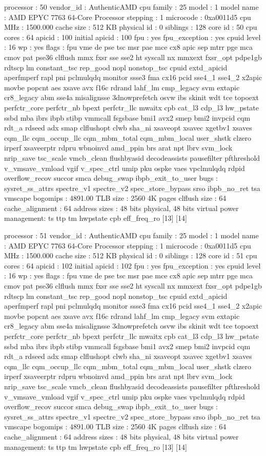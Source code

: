 processor	: 50
vendor_id	: AuthenticAMD
cpu family	: 25
model		: 1
model name	: AMD EPYC 7763 64-Core Processor
stepping	: 1
microcode	: 0xa0011d5
cpu MHz		: 1500.000
cache size	: 512 KB
physical id	: 0
siblings	: 128
core id		: 50
cpu cores	: 64
apicid		: 100
initial apicid	: 100
fpu		: yes
fpu_exception	: yes
cpuid level	: 16
wp		: yes
flags		: fpu vme de pse tsc msr pae mce cx8 apic sep mtrr pge mca cmov pat pse36 clflush mmx fxsr sse sse2 ht syscall nx mmxext fxsr_opt pdpe1gb rdtscp lm constant_tsc rep_good nopl nonstop_tsc cpuid extd_apicid aperfmperf rapl pni pclmulqdq monitor ssse3 fma cx16 pcid sse4_1 sse4_2 x2apic movbe popcnt aes xsave avx f16c rdrand lahf_lm cmp_legacy svm extapic cr8_legacy abm sse4a misalignsse 3dnowprefetch osvw ibs skinit wdt tce topoext perfctr_core perfctr_nb bpext perfctr_llc mwaitx cpb cat_l3 cdp_l3 hw_pstate ssbd mba ibrs ibpb stibp vmmcall fsgsbase bmi1 avx2 smep bmi2 invpcid cqm rdt_a rdseed adx smap clflushopt clwb sha_ni xsaveopt xsavec xgetbv1 xsaves cqm_llc cqm_occup_llc cqm_mbm_total cqm_mbm_local user_shstk clzero irperf xsaveerptr rdpru wbnoinvd amd_ppin brs arat npt lbrv svm_lock nrip_save tsc_scale vmcb_clean flushbyasid decodeassists pausefilter pfthreshold v_vmsave_vmload vgif v_spec_ctrl umip pku ospke vaes vpclmulqdq rdpid overflow_recov succor smca debug_swap ibpb_exit_to_user
bugs		: sysret_ss_attrs spectre_v1 spectre_v2 spec_store_bypass srso ibpb_no_ret tsa vmscape
bogomips	: 4891.00
TLB size	: 2560 4K pages
clflush size	: 64
cache_alignment	: 64
address sizes	: 48 bits physical, 48 bits virtual
power management: ts ttp tm hwpstate cpb eff_freq_ro [13] [14]

processor	: 51
vendor_id	: AuthenticAMD
cpu family	: 25
model		: 1
model name	: AMD EPYC 7763 64-Core Processor
stepping	: 1
microcode	: 0xa0011d5
cpu MHz		: 1500.000
cache size	: 512 KB
physical id	: 0
siblings	: 128
core id		: 51
cpu cores	: 64
apicid		: 102
initial apicid	: 102
fpu		: yes
fpu_exception	: yes
cpuid level	: 16
wp		: yes
flags		: fpu vme de pse tsc msr pae mce cx8 apic sep mtrr pge mca cmov pat pse36 clflush mmx fxsr sse sse2 ht syscall nx mmxext fxsr_opt pdpe1gb rdtscp lm constant_tsc rep_good nopl nonstop_tsc cpuid extd_apicid aperfmperf rapl pni pclmulqdq monitor ssse3 fma cx16 pcid sse4_1 sse4_2 x2apic movbe popcnt aes xsave avx f16c rdrand lahf_lm cmp_legacy svm extapic cr8_legacy abm sse4a misalignsse 3dnowprefetch osvw ibs skinit wdt tce topoext perfctr_core perfctr_nb bpext perfctr_llc mwaitx cpb cat_l3 cdp_l3 hw_pstate ssbd mba ibrs ibpb stibp vmmcall fsgsbase bmi1 avx2 smep bmi2 invpcid cqm rdt_a rdseed adx smap clflushopt clwb sha_ni xsaveopt xsavec xgetbv1 xsaves cqm_llc cqm_occup_llc cqm_mbm_total cqm_mbm_local user_shstk clzero irperf xsaveerptr rdpru wbnoinvd amd_ppin brs arat npt lbrv svm_lock nrip_save tsc_scale vmcb_clean flushbyasid decodeassists pausefilter pfthreshold v_vmsave_vmload vgif v_spec_ctrl umip pku ospke vaes vpclmulqdq rdpid overflow_recov succor smca debug_swap ibpb_exit_to_user
bugs		: sysret_ss_attrs spectre_v1 spectre_v2 spec_store_bypass srso ibpb_no_ret tsa vmscape
bogomips	: 4891.00
TLB size	: 2560 4K pages
clflush size	: 64
cache_alignment	: 64
address sizes	: 48 bits physical, 48 bits virtual
power management: ts ttp tm hwpstate cpb eff_freq_ro [13] [14]

